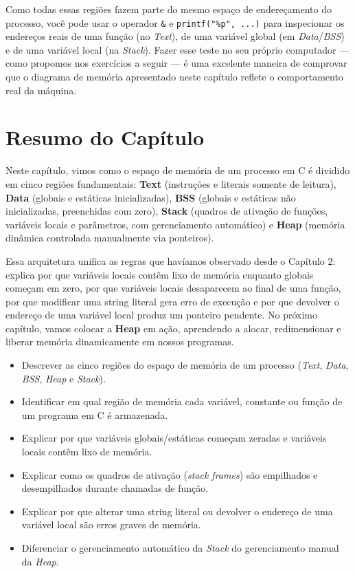 \begin{observacao}
Como todas essas regiões fazem parte do mesmo espaço de endereçamento do processo, você pode usar o operador \texttt{\&} e \texttt{printf("\%p", ...)} para inspecionar os endereços reais de uma função (no \textit{Text}), de uma variável global (em \textit{Data}/\textit{BSS}) e de uma variável local (na \textit{Stack}). Fazer esse teste no seu próprio computador — como propomos nos exercícios a seguir — é uma excelente maneira de comprovar que o diagrama de memória apresentado neste capítulo reflete o comportamento real da máquina.
\end{observacao}

\section*{Resumo do Capítulo}

Neste capítulo, vimos como o espaço de memória de um processo em C é dividido em cinco regiões fundamentais: \textbf{Text} (instruções e literais somente de leitura), \textbf{Data} (globais e estáticas inicializadas), \textbf{BSS} (globais e estáticas não inicializadas, preenchidas com zero), \textbf{Stack} (quadros de ativação de funções, variáveis locais e parâmetros, com gerenciamento automático) e \textbf{Heap} (memória dinâmica controlada manualmente via ponteiros).

Essa arquitetura unifica as regras que havíamos observado desde o Capítulo 2: explica por que variáveis locais contêm lixo de memória enquanto globais começam em zero, por que variáveis locais desaparecem ao final de uma função, por que modificar uma string literal gera erro de execução e por que devolver o endereço de uma variável local produz um ponteiro pendente. No próximo capítulo, vamos colocar a \textbf{Heap} em ação, aprendendo a alocar, redimensionar e liberar memória dinamicamente em nossos programas.

\begin{objetivos}
\begin{itemize}
    \item Descrever as cinco regiões do espaço de memória de um processo (\textit{Text}, \textit{Data}, \textit{BSS}, \textit{Heap} e \textit{Stack}).
    \item Identificar em qual região de memória cada variável, constante ou função de um programa em C é armazenada.
    \item Explicar por que variáveis globais/estáticas começam zeradas e variáveis locais contêm lixo de memória.
    \item Explicar como os quadros de ativação (\textit{stack frames}) são empilhados e desempilhados durante chamadas de função.
    \item Explicar por que alterar uma string literal ou devolver o endereço de uma variável local são erros graves de memória.
    \item Diferenciar o gerenciamento automático da \textit{Stack} do gerenciamento manual da \textit{Heap}.
\end{itemize}
\end{objetivos}

